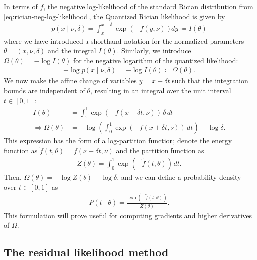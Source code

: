 \documentclass{article}
\begin{document}
In terms of $f$, the negative log-likelihood of the standard Rician distribution from \cref{eq:rician-neg-log-likelihood}, the Quantized Rician likelihood is given by
%
\begin{align}
  p(x \mid \nu, \delta) = \int_x^{x+\delta} \exp(-f(y, \nu)) dy \coloneqq I(\theta)
\end{align}
%
where we have introduced a shorthand notation for the normalized parameters $\theta = (x, \nu, \delta)$ and the integral $I(\theta)$.
Similarly, we introduce $\Omega(\theta) = -\log I(\theta)$ for the negative logarithm of the quantized likelihood:
%
\begin{align}
  -\log p(x \mid \nu, \delta) = -\log I(\theta) \coloneqq \Omega(\theta).
\end{align}
%
We now make the affine change of variables $y = x + \delta t$ such that the integration bounds are independent of $\theta$, resulting in an integral over the unit interval $t \in [0, 1]$:
%
\begin{align}
  I(\theta)                  & = \int_0^1 \exp(-f(x + \delta t, \nu)) \, \delta \, dt                       \\
  \Rightarrow \Omega(\theta) & = -\log\left(\int_0^1 \exp(-f(x + \delta t, \nu)) \, dt\right) - \log\delta.
\end{align}
%
This expression has the form of a log-partition function;
denote the energy function as $\tilde{f}(t, \theta) = f(x + \delta t, \nu)$ and the partition function as
%
\begin{align}
  Z(\theta) = \int_0^1 \exp(-\tilde{f}(t, \theta)) \, dt.
\end{align}
%
Then, $\Omega(\theta) = -\log Z(\theta) - \log\delta$, and we can define a probability density over $t \in [0,1]$ as
%
\begin{align}
  P(t \mid \theta) = \frac{\exp(-\tilde{f}(t, \theta))}{Z(\theta)}.
\end{align}
%
This formulation will prove useful for computing gradients and higher derivatives of $\Omega$.

\subsection{The residual likelihood method}
\end{document}
